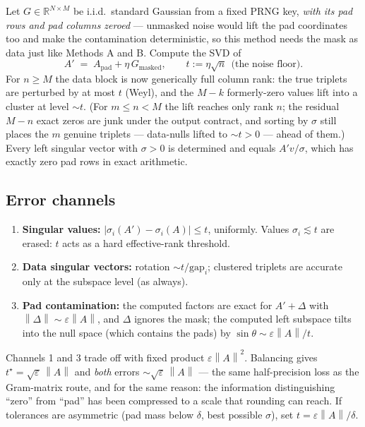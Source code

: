 \documentclass[11pt]{article}
\newcommand{\R}{\mathbb{R}}
\newcommand{\Apad}{A_{\mathrm{pad}}}
\newcommand{\norm}[1]{\left\lVert #1 \right\rVert}
\begin{document}
Let $G \in \R^{N \times M}$ be i.i.d.\ standard Gaussian from a fixed PRNG key,
\emph{with its pad rows and pad columns zeroed} --- unmasked noise would lift
the pad coordinates too and make the contamination deterministic, so this
method needs the mask as data just like Methods A and B. Compute the SVD of
\[
  A' \;=\; \Apad + \eta\, G_{\mathrm{masked}},
  \qquad t := \eta\sqrt{n} \ \ \text{(the noise floor).}
\]
For $n \ge M$ the data block is now generically full column rank: the true
triplets are perturbed by at most $t$ (Weyl), and the $M - k$ formerly-zero
values lift into a cluster at level $\sim t$. (For $m \le n < M$ the lift
reaches only rank $n$; the residual $M - n$ exact zeros are junk under the
output contract, and sorting by $\sigma$ still places the $m$ genuine
triplets --- data-nulls lifted to $\sim t > 0$ --- ahead of them.)
Every left singular vector with $\sigma > 0$ is determined and equals
$A'v/\sigma$, which has exactly zero pad rows in exact arithmetic.

\subsection*{Error channels}

\begin{enumerate}[itemsep=1pt]
  \item \textbf{Singular values:} $|\sigma_i(A') - \sigma_i(A)| \le t$,
        uniformly. Values $\sigma_i \lesssim t$ are erased: $t$ acts as a hard
        effective-rank threshold.
  \item \textbf{Data singular vectors:} rotation $\sim t / \mathrm{gap}_i$;
        clustered triplets are accurate only at the subspace level (as always).
  \item \textbf{Pad contamination:} the computed factors are exact for
        $A' + \Delta$ with $\norm{\Delta} \sim \varepsilon \norm{A}$, and
        $\Delta$ ignores the mask; the computed left subspace tilts into the
        null space (which contains the pads) by
        $\sin\theta \sim \varepsilon \norm{A} / t$.
\end{enumerate}

Channels 1 and 3 trade off with fixed product
$\varepsilon \norm{A}^2$. Balancing gives
$t^\star = \sqrt{\varepsilon}\,\norm{A}$ and \emph{both} errors
$\sim \sqrt{\varepsilon}\,\norm{A}$ --- the same half-precision loss as the
Gram-matrix route, and for the same reason: the information distinguishing
``zero'' from ``pad'' has been compressed to a scale that rounding can reach.
If tolerances are asymmetric (pad mass below $\delta$, best possible
$\sigma$), set $t = \varepsilon\norm{A}/\delta$.
\end{document}
